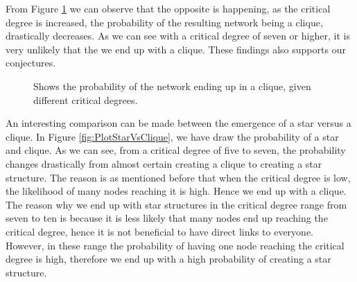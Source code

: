 From Figure \ref{fig:PlotClique} we can observe that the opposite is happening, as the critical degree is increased, the probability of the resulting network being a clique, drastically decreases. As we can see with a critical degree of seven or higher, it is very unlikely that the we end up with a clique. These findings also supports our conjectures.

\begin{figure}
\centering
{}
\caption{\label{fig:PlotClique} Shows the probability of the network ending up in a clique, given different critical degrees.}
\end{figure}


An interesting comparison can be made between the emergence of a star versus a clique. In Figure \ref{fig:PlotStarVsClique}, we have draw the probability of a star and clique. As we can see, from a critical degree of five to seven, the probability changes drastically from almost certain creating a clique to creating a star structure. The reason is as mentioned before that when the critical degree is low, the likelihood of many nodes reaching it is high. Hence we end up with a clique. The reason why we end up with star structures in the critical degree range from seven to ten is because it is less likely that many nodes end up reaching the critical degree, hence it is not beneficial to have direct links to everyone. However, in these range the probability of having one node reaching the critical degree is high, therefore we end up with a high probability of creating a star structure. 



